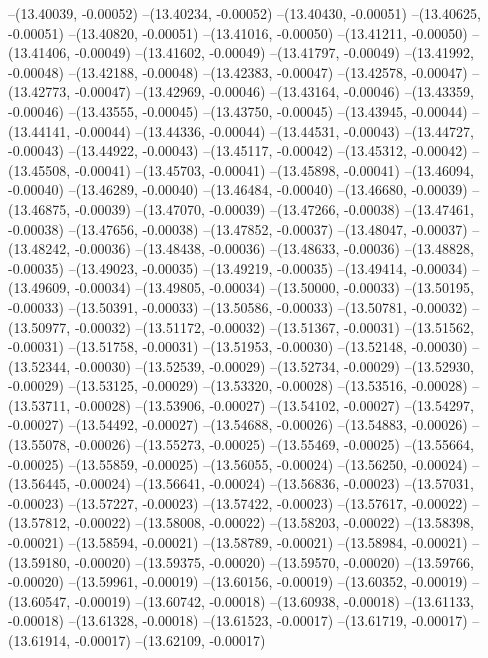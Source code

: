--(13.40039, -0.00052)
--(13.40234, -0.00052)
--(13.40430, -0.00051)
--(13.40625, -0.00051)
--(13.40820, -0.00051)
--(13.41016, -0.00050)
--(13.41211, -0.00050)
--(13.41406, -0.00049)
--(13.41602, -0.00049)
--(13.41797, -0.00049)
--(13.41992, -0.00048)
--(13.42188, -0.00048)
--(13.42383, -0.00047)
--(13.42578, -0.00047)
--(13.42773, -0.00047)
--(13.42969, -0.00046)
--(13.43164, -0.00046)
--(13.43359, -0.00046)
--(13.43555, -0.00045)
--(13.43750, -0.00045)
--(13.43945, -0.00044)
--(13.44141, -0.00044)
--(13.44336, -0.00044)
--(13.44531, -0.00043)
--(13.44727, -0.00043)
--(13.44922, -0.00043)
--(13.45117, -0.00042)
--(13.45312, -0.00042)
--(13.45508, -0.00041)
--(13.45703, -0.00041)
--(13.45898, -0.00041)
--(13.46094, -0.00040)
--(13.46289, -0.00040)
--(13.46484, -0.00040)
--(13.46680, -0.00039)
--(13.46875, -0.00039)
--(13.47070, -0.00039)
--(13.47266, -0.00038)
--(13.47461, -0.00038)
--(13.47656, -0.00038)
--(13.47852, -0.00037)
--(13.48047, -0.00037)
--(13.48242, -0.00036)
--(13.48438, -0.00036)
--(13.48633, -0.00036)
--(13.48828, -0.00035)
--(13.49023, -0.00035)
--(13.49219, -0.00035)
--(13.49414, -0.00034)
--(13.49609, -0.00034)
--(13.49805, -0.00034)
--(13.50000, -0.00033)
--(13.50195, -0.00033)
--(13.50391, -0.00033)
--(13.50586, -0.00033)
--(13.50781, -0.00032)
--(13.50977, -0.00032)
--(13.51172, -0.00032)
--(13.51367, -0.00031)
--(13.51562, -0.00031)
--(13.51758, -0.00031)
--(13.51953, -0.00030)
--(13.52148, -0.00030)
--(13.52344, -0.00030)
--(13.52539, -0.00029)
--(13.52734, -0.00029)
--(13.52930, -0.00029)
--(13.53125, -0.00029)
--(13.53320, -0.00028)
--(13.53516, -0.00028)
--(13.53711, -0.00028)
--(13.53906, -0.00027)
--(13.54102, -0.00027)
--(13.54297, -0.00027)
--(13.54492, -0.00027)
--(13.54688, -0.00026)
--(13.54883, -0.00026)
--(13.55078, -0.00026)
--(13.55273, -0.00025)
--(13.55469, -0.00025)
--(13.55664, -0.00025)
--(13.55859, -0.00025)
--(13.56055, -0.00024)
--(13.56250, -0.00024)
--(13.56445, -0.00024)
--(13.56641, -0.00024)
--(13.56836, -0.00023)
--(13.57031, -0.00023)
--(13.57227, -0.00023)
--(13.57422, -0.00023)
--(13.57617, -0.00022)
--(13.57812, -0.00022)
--(13.58008, -0.00022)
--(13.58203, -0.00022)
--(13.58398, -0.00021)
--(13.58594, -0.00021)
--(13.58789, -0.00021)
--(13.58984, -0.00021)
--(13.59180, -0.00020)
--(13.59375, -0.00020)
--(13.59570, -0.00020)
--(13.59766, -0.00020)
--(13.59961, -0.00019)
--(13.60156, -0.00019)
--(13.60352, -0.00019)
--(13.60547, -0.00019)
--(13.60742, -0.00018)
--(13.60938, -0.00018)
--(13.61133, -0.00018)
--(13.61328, -0.00018)
--(13.61523, -0.00017)
--(13.61719, -0.00017)
--(13.61914, -0.00017)
--(13.62109, -0.00017)
